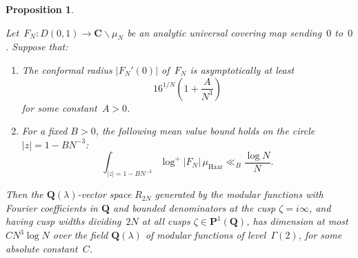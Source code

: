 \documentclass[10pt]{amsart}
\renewcommand\setminus{\smallsetminus}
\def\Q{\mathbf{Q}}
\renewcommand\mathbb{\mathbf}
\newtheorem{proposition}[subsubsection]{Proposition}
\theoremstyle{remark}
\numberwithin{equation}{subsection}
\def\C{\mathbf{C}}
\begin{document}
\begin{proposition} \label{strategy}


Let~$F_N: D(0,1) \rightarrow \C \setminus  \mu_N$ be an analytic universal covering map sending~$0$  to~$0$.
Suppose that:
\begin{enumerate}
\item \label{radius} The conformal radius $|F_N'(0)|$ of~$F_N$ is asymptotically at least
$$16^{1/N} \left(1 + \frac{A}{N^3} \right)$$
 for some constant~$A > 0$.
\item \label{mean}  For a fixed $B > 0$, the following mean value bound holds on the circle $|z| = 1 - BN^{-3}$: 
$$
\int_{|z| = 1 - BN^{-3}} \log^+{|F_N|} \, \mu_{\mathrm{Haar}}   \ll_B \frac{\log{N}}{N}.
$$
\end{enumerate}
Then the $\Q(\lambda)$-vector space $R_{2N}$ generated by the modular functions with Fourier coefficients in $\Q$ and bounded denominators at the cusp $\zeta = i \infty$, and having cusp widths dividing~$2N$ at all cusps $\zeta \in \mathbb{P}^1(\Q)$, has dimension at most~$CN^3\log{N}$ over the field $\Q(\lambda)$ of modular functions of
level~$\Gamma(2)$,
for some absolute constant~$C$.
\end{proposition}
\end{document}
